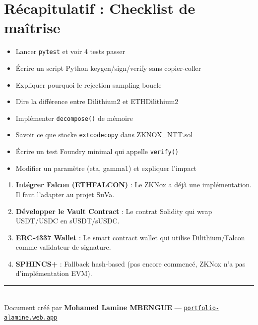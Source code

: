 \documentclass[12pt, a4paper]{article}
\begin{document}
\newpage
\section{Récapitulatif : Checklist de maîtrise}

\begin{tcolorbox}[colback=success_bg, colframe=sol_green, title=\textbf{Checklist --- Tu es prêt quand tu peux :}]
\begin{itemize}[label=$\square$]
  \item[\checkmark] Lancer \texttt{pytest} et voir 4 tests passer
  \item[\checkmark] Écrire un script Python keygen/sign/verify sans copier-coller
  \item[\checkmark] Expliquer pourquoi le rejection sampling boucle
  \item[\checkmark] Dire la différence entre Dilithium2 et ETHDilithium2
  \item[\checkmark] Implémenter \texttt{decompose()} de mémoire
  \item[\checkmark] Savoir ce que stocke \texttt{extcodecopy} dans ZKNOX\_NTT.sol
  \item[\checkmark] Écrire un test Foundry minimal qui appelle \texttt{verify()}
  \item[\checkmark] Modifier un paramètre (eta, gamma1) et expliquer l'impact
\end{itemize}
\end{tcolorbox}

\begin{tcolorbox}[colback=warn_bg, colframe=orange!80!black, title=\textbf{Prochaines étapes}]
\begin{enumerate}
  \item \textbf{Intégrer Falcon (ETHFALCON)} : Le ZKNox a déjà une implémentation. Il faut l'adapter au projet SuVa.
  \item \textbf{Développer le Vault Contract} : Le contrat Solidity qui wrap USDT/USDC en sUSDT/sUSDC.
  \item \textbf{ERC-4337 Wallet} : Le smart contract wallet qui utilise Dilithium/Falcon comme validateur de signature.
  \item \textbf{SPHINCS+} : Fallback hash-based (pas encore commencé, ZKNox n'a pas d'implémentation EVM).
\end{enumerate}
\end{tcolorbox}

\vspace{1cm}
\begin{center}
  {\color{suva_blue}\rule{0.5\linewidth}{1pt}}\\[0.3cm]
  {\small\color{gray} Document créé par \textbf{Mohamed Lamine MBENGUE} ---
  \href{https://portfolio-alamine.web.app}{\texttt{portfolio-alamine.web.app}}}
\end{center}
\end{document}

